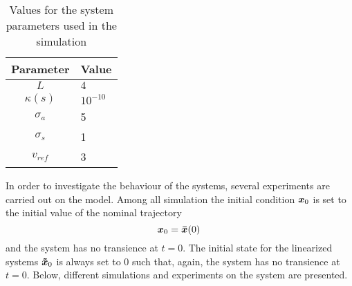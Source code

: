 \begin{table}[h]
	\centering
	\begin{tabular}{c|l}
	\hline
	\hline
	\textbf{Parameter} & \textbf{Value}\\
	\hline
	$L$ & $4$\\
	$\kappa (s)$ & $10^{-10}$\\
	$\sigma_a$ & 5\\
	$\sigma_s$ & 1\\
	$v_{ref}$ & 3\\
	\hline
	\hline
	\end{tabular}
	\caption{Values for the system parameters used in the simulation}
	\label{tab:simu_param_values}
\end{table}
In order to investigate the behaviour of the systems, several experiments are carried out on the model.
Among all simulation the initial condition $\boldsymbol{x}_0$ is set to the initial value of the nominal trajectory 
\begin{equation}
	\boldsymbol{x}_0 = \boldsymbol{\bar{x}} (0) \, 
\end{equation}
and the system has no transience at $t = 0$. 
The initial state for the linearized systems $\boldsymbol{\tilde{x}}_0$ is always set to $0$ such that, again, the system has no transience at $t=0$.
Below, different simulations and experiments on the system are presented.

